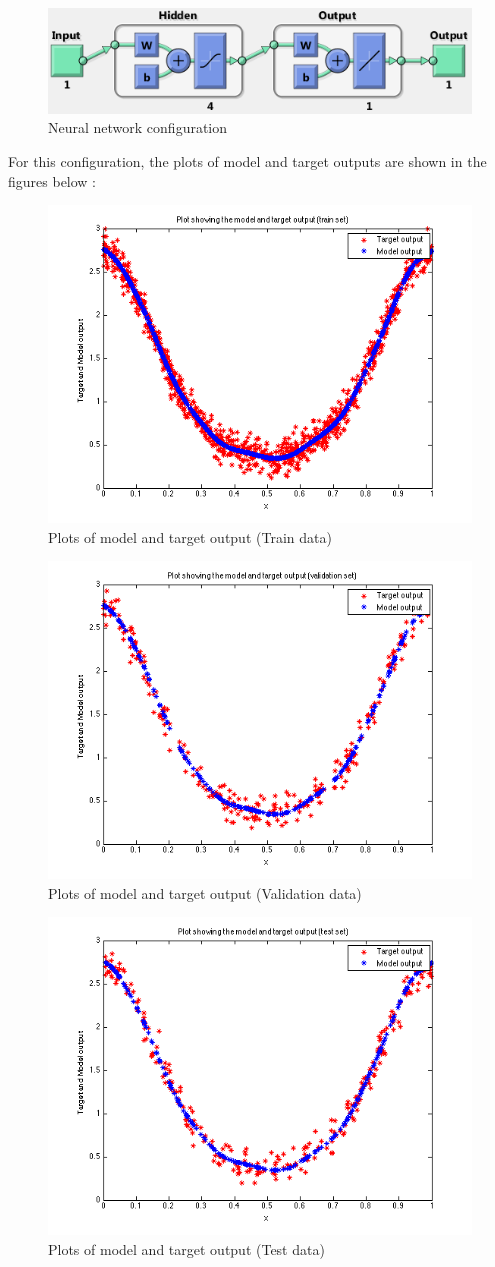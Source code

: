 \begin{figure}[H]
\centering
\includegraphics[width=0.6\linewidth]{Regression/univariate/net_config.png}
\caption{Neural network configuration}
\end{figure}

For this configuration, the plots of model and target outputs are shown in the figures below : 

\begin{figure}[H]
\centering
\includegraphics[width=0.5\linewidth]{Regression/univariate/trainOutput.png}
\caption{Plots of model and target output (Train data)}
\end{figure}

\begin{figure}[H]
\centering
\includegraphics[width=0.5\linewidth]{Regression/univariate/valOutput.png}
\caption{Plots of model and target output (Validation data)}
\end{figure}

\begin{figure}[H]
\centering
\includegraphics[width=0.5\linewidth]{Regression/univariate/testOutput.png}
\caption{Plots of model and target output (Test data)}
\end{figure}

